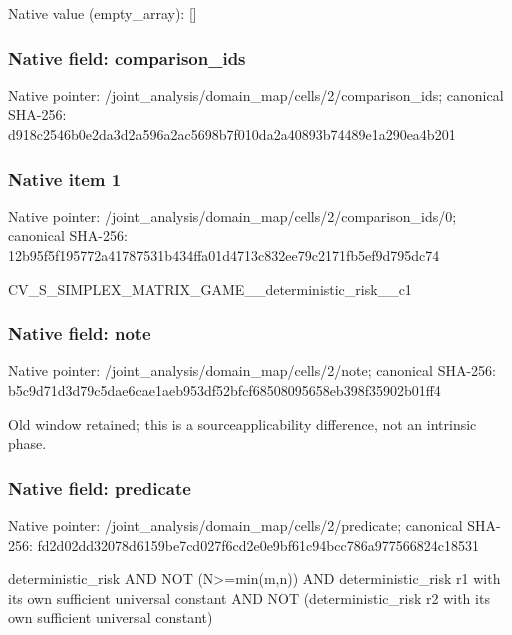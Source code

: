 \documentclass[10pt,a4paper]{article}
\begin{document}
Native value (empty\_array): []



\subsubsection{Native field: comparison\_ids}


Native pointer: /joint\_analysis/domain\_m\allowbreak{}ap/cells/2/comparison\_id\allowbreak{}s; canonical SHA-256: d918c2546b0e2da3d2a596a2\allowbreak{}ac5698b7f010da2a40893b74\allowbreak{}489e1a290ea4b201



\subsubsection{Native item 1}


Native pointer: /joint\_analysis/domain\_m\allowbreak{}ap/cells/2/comparison\_id\allowbreak{}s/0; canonical SHA-256: 12b95f5f195772a41787531b\allowbreak{}434ffa01d4713c832ee79c21\allowbreak{}71fb5ef9d795dc74


CV\_S\_SIMPLEX\_MATRIX\_GAME\allowbreak{}\_\_deterministic\_risk\_\_c1


\subsubsection{Native field: note}


Native pointer: /joint\_analysis/domain\_map/cells/2/note; canonical SHA-256: b5c9d71d3d79c5dae6cae1ae\allowbreak{}b953df52bfcf68508095658e\allowbreak{}b398f35902b01ff4


Old window retained; this is a sourceapplicability difference, not an intrinsic phase.


\subsubsection{Native field: predicate}


Native pointer: /joint\_analysis/domain\_m\allowbreak{}ap/cells/2/predicate; canonical SHA-256: fd2d02dd32078d6159be7cd0\allowbreak{}27f6cd2e0e9bf61c94bcc786\allowbreak{}a977566824c18531


deterministic\_risk AND NOT (N>=min(m,n)) AND deterministic\_risk r1 with its own sufficient universal constant AND NOT (deterministic\_risk r2 with its own sufficient universal constant)
\end{document}

